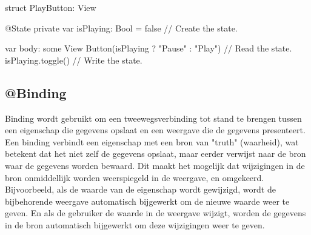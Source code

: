 \begin{swift}[caption=Example of @State code, label=state_example]
    struct PlayButton: View {
        @State private var isPlaying: Bool = false // Create the state.
        
        
        var body: some View {
            Button(isPlaying ? "Pause" : "Play") { // Read the state.
                isPlaying.toggle() // Write the state.
            }
        }
    }
\end{swift}


\subsection{@Binding}
\autocite{AppleBinding} Binding wordt gebruikt om een tweewegsverbinding tot stand te brengen tussen een eigenschap die gegevens opslaat en een weergave die de gegevens presenteert. Een binding verbindt een eigenschap met een bron van "truth" (waarheid), wat betekent dat het niet zelf de gegevens opslaat, maar eerder verwijst naar de bron waar de gegevens worden bewaard. Dit maakt het mogelijk dat wijzigingen in de bron onmiddellijk worden weerspiegeld in de weergave, en omgekeerd. Bijvoorbeeld, als de waarde van de eigenschap wordt gewijzigd, wordt de bijbehorende weergave automatisch bijgewerkt om de nieuwe waarde weer te geven. En als de gebruiker de waarde in de weergave wijzigt, worden de gegevens in de bron automatisch bijgewerkt om deze wijzigingen weer te geven.



